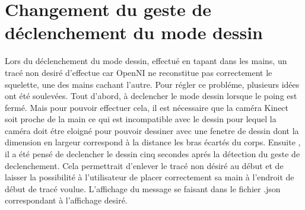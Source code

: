\section{Changement du geste de déclenchement du mode dessin}
Lors du déclenchement du mode dessin, effectué en tapant dans les mains, un tracé non desiré d'effectue car OpenNI ne reconstitue pas correctement le squelette, une des mains cachant l'autre. 
Pour régler ce probléme, plusieurs idées ont été soulevées. Tout d'abord, à declencher le mode dessin lorsque le poing est fermé. Mais pour pouvoir effectuer cela, il est nécessaire que la caméra Kinect soit proche de la main ce qui est incompatible avec le dessin pour lequel la caméra doit étre eloigné pour pouvoir dessiner avec une fenetre de dessin dont la dimension en largeur correspond à la distance les bras écartés du corps.
Ensuite , il a été pensé de declencher le dessin cinq secondes aprés la détection du geste de declenchement. Cela permettrait d'enlever le tracé non désiré au début et de laisser la possibilité à l'utilisateur de placer correctement sa main à l'endroit de début de tracé voulue. L'affichage du message se faisant dans le fichier .json correspondant à l'affichage desiré.






